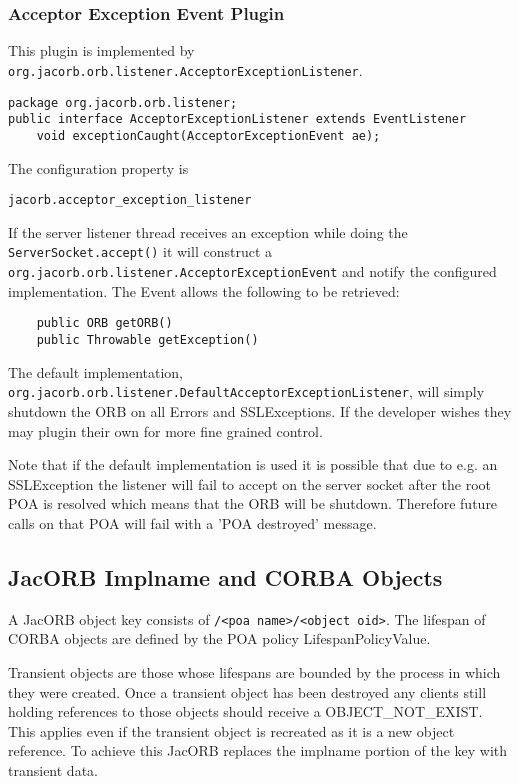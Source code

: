 {{\subsubsection{Acceptor Exception Event Plugin}
\label{acceptorevent}
This plugin is implemented by {\tt
org.jacorb.orb.listener.AcceptorExceptionListener}.
\begin{small}
\begin{verbatim}
package org.jacorb.orb.listener;
public interface AcceptorExceptionListener extends EventListener
    void exceptionCaught(AcceptorExceptionEvent ae);
\end{verbatim}
\end{small}
The configuration property is
\begin{verbatim}
jacorb.acceptor_exception_listener
\end{verbatim}
If the server listener thread receives an exception while doing the {\tt
ServerSocket.accept()} it will construct a {\tt
org.jacorb.orb.listener.AcceptorExceptionEvent} and notify the configured
implementation. The Event allows the following to be retrieved:
\begin{small}
\begin{verbatim}
    public ORB getORB()
    public Throwable getException()
\end{verbatim}
\end{small}
The default implementation, {\tt
org.jacorb.orb.listener.DefaultAcceptor\-ExceptionListener}, will simply shutdown
the ORB on all Errors and SSLExceptions. If the developer wishes they may plugin
their own for more fine grained control.

Note that if the default implementation is used it is possible that due to e.g.
an SSLException the listener will fail to accept on the server socket after the
root POA is resolved which means that the ORB will be shutdown. Therefore future
calls on that POA will fail with a 'POA destroyed' message.

\subsection{JacORB Implname and CORBA Objects}
\label{implname}
A JacORB object key consists of {\tt <impl name>/<poa name>/<object oid>}. The lifespan of CORBA objects are defined by the POA policy LifespanPolicyValue.

Transient objects are those whose lifespans are bounded by the process in which they were created. Once a transient object has been destroyed any clients still holding references to those objects should receive a OBJECT\_NOT\_EXIST. This applies even if the transient object is recreated as it is a new object reference. To achieve this JacORB replaces the implname portion of the key with transient data.

}}
